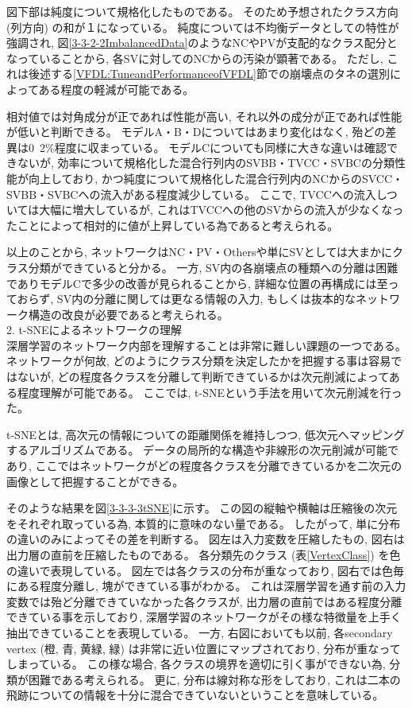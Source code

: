 図下部は純度について規格化したものである。
そのため予想されたクラス方向 (列方向) の和が１になっている。
純度については不均衡データとしての特性が強調され, 図\ref{3-3-2-2ImbalancedData}のようなNCやPVが支配的なクラス配分となっていることから, 各SVに対してのNCからの汚染が顕著である。
ただし, これは後述する\ref{VFDL:TuneandPerformanceofVFDL}節での崩壊点のタネの選別によってある程度の軽減が可能である。

相対値では対角成分が正であれば性能が高い, それ以外の成分が正であれば性能が低いと判断できる。
モデルA・B・Dについてはあまり変化はなく, 殆どの差異は$0$~$2$\%程度に収まっている。
モデルCについても同様に大きな違いは確認できないが, 効率について規格化した混合行列内のSVBB・TVCC・SVBCの分類性能が向上しており, かつ純度について規格化した混合行列内のNCからのSVCC・SVBB・SVBCへの流入がある程度減少している。
ここで, TVCCへの流入しついては大幅に増大しているが, これはTVCCへの他のSVからの流入が少なくなったことによって相対的に値が上昇している為であると考えられる。

以上のことから, ネットワークはNC・PV・Othersや単にSVとしては大まかにクラス分類ができていると分かる。
一方, SV内の各崩壊点の種類への分離は困難でありモデルCで多少の改善が見られることから, 詳細な位置の再構成には至っておらず, SV内の分離に関しては更なる情報の入力, もしくは抜本的なネットワーク構造の改良が必要であると考えられる。\\

2. t-SNEによるネットワークの理解\\

深層学習のネットワーク内部を理解することは非常に難しい課題の一つである。
ネットワークが何故, どのようにクラス分類を決定したかを把握する事は容易ではないが, どの程度各クラスを分離して判断できているかは次元削減によってある程度理解が可能である。
ここでは, t-SNEという手法を用いて次元削減を行った。

t-SNEとは, 高次元の情報についての距離関係を維持しつつ, 低次元へマッピングするアルゴリズムである。
データの局所的な構造や非線形の次元削減が可能であり, ここではネットワークがどの程度各クラスを分離できているかを二次元の画像として把握することができる。

そのような結果を図\ref{3-3-3-3tSNE}に示す。
この図の縦軸や横軸は圧縮後の次元をそれぞれ取っている為, 本質的に意味のない量である。
したがって, 単に分布の違いのみによってその差を判断する。
図左は入力変数を圧縮したもの, 図右は出力層の直前を圧縮したものである。
各分類先のクラス (表\ref{VertexClass}) を色の違いで表現している。
図左では各クラスの分布が重なっており, 図右では色毎にある程度分離し, 塊ができている事がわかる。
これは深層学習を通す前の入力変数では殆ど分離できていなかった各クラスが, 出力層の直前ではある程度分離できている事を示しており, 深層学習のネットワークがその様な特徴量を上手く抽出できていることを表現している。
一方, 右図においても以前, 各secondary vertex (橙, 青, 黄緑, 緑) は非常に近い位置にマップされており, 分布が重なってしまっている。
この様な場合, 各クラスの境界を適切に引く事ができない為, 分類が困難である考えられる。
更に, 分布は線対称な形をしており, これは二本の飛跡についての情報を十分に混合できていないということを意味している。

